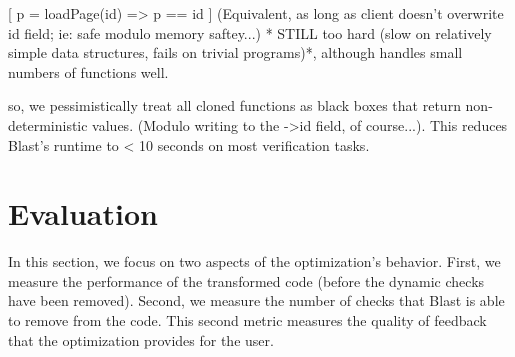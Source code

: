 \documentclass[10pt,letterpaper,twocolumn,english]{article}
\begin{document}
[ p = loadPage(id) => p == id     ]  (Equivalent, as long as client doesn't overwrite id field; ie: safe modulo memory saftey...)
* STILL too hard (slow on relatively simple data structures, fails on trivial programs)*, although handles small numbers of functions well.

so, we pessimistically treat all cloned functions as black boxes that return non-deterministic values.  (Modulo writing to the ->id field, of course...).   This reduces Blast's runtime to < 10 seconds on most verification tasks.


\section{Evaluation}

In this section, we focus on two aspects of the optimization's
behavior.  First, we measure the performance of the transformed code
(before the dynamic checks have been removed).  Second, we measure the
number of checks that Blast is able to remove from the code.  This
second metric measures the quality of feedback that the optimization
provides for the user.
\end{document}
